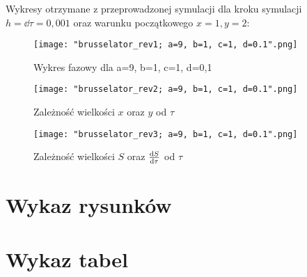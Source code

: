 \documentclass[10pt, a4paper, twoside, onecolumn]{article}
\numberwithin{equation}{section}
\begin{document}
	Wykresy otrzymane z przeprowadzonej symulacji dla kroku symulacji \(h = \dd{\tau} = 0,001\) oraz warunku początkowego \(x=1, y=2\):
	\begin{figure}[H]
		\centering
		\texttt{[image: "brusselator\_rev1; a=9, b=1, c=1, d=0.1".png]}
		\caption{Wykres fazowy dla a=9, b=1, c=1, d=0,1}
	\end{figure}
	\begin{figure}[H]
		\centering
		\texttt{[image: "brusselator\_rev2; a=9, b=1, c=1, d=0.1".png]}
		\caption{Zależność wielkości \(x\) oraz \(y\) od \(\tau\)}
	\end{figure}
	\begin{figure}[H]
		\centering
		\texttt{[image: "brusselator\_rev3; a=9, b=1, c=1, d=0.1".png]}
		\caption{Zależność wielkości \(S\) oraz \(\dv{S}{\tau}\) od \(\tau\)}
	\end{figure}
	
	
	\pagebreak
	\printbibliography[title=Wykaz literatury]
	\pagebreak
	\section*{Wykaz rysunków}
	\pagebreak
	\section*{Wykaz tabel}
	\pagebreak
\end{document}
